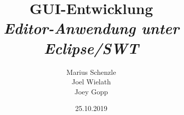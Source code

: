 

\title{\textbf{GUI-Entwicklung}\\\textit{Editor-Anwendung unter Eclipse/SWT}}
\author{Marius Schenzle\\Joel Wielath\\Joey Gopp}
\date{25.10.2019}


\doublespacing
{}
\maketitle
\newpage
\tableofcontents
\newpage
\singlespacing
{}


\newpage


\newpage


\newpage



